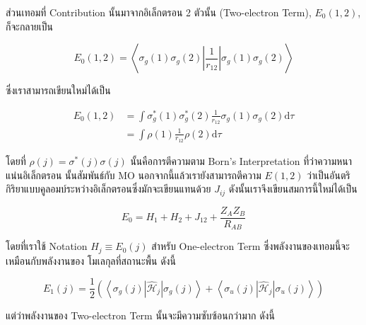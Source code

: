 ส่วนเทอมที่ Contribution นั้นมาจากอิเล็กตรอน 2 ตัวนั้น (Two-electron Term), $E_0(1,2)$, ก็จะกลายเป็น

\begin{equation}
    \label{eq:energy_one_electron_ground_state}
    E_0(1,2) 
    = 
    \left\langle
    \sigma_g(1) \sigma_g(2)\left|\frac{1}{r_{12}}\right| \sigma_g(1) \sigma_g(2)
    \right\rangle
\end{equation}

\noindent ซึ่งเราสามารถเขียนใหม่ได้เป็น

\begin{equation}
    \label{eq:energy_two_electron_ground_state}
    \begin{aligned}
        E_0(1,2) 
        & = \int \sigma_g^*(1) \sigma_g^*(2) \frac{1}{r_{12}} \sigma_g(1) \sigma_g(2) \mathrm{d} \tau \\
        & =\int \rho(1) \frac{1}{r_{12}} \rho(2) \mathrm{d} \tau
    \end{aligned}
\end{equation}

\noindent โดยที่ $\rho(j) = \sigma^*(j) \sigma(j)$ นั้นคือการตีความตาม Born's Interpretation ที่ว่าความหนาแน่นอิเล็กตรอน%
นั้นสัมพันธ์กับ MO นอกจากนี้แล้วเรายังสามารถตีความ $E(1,2)$ ว่าเป็นอันตริกิริยาแบบคูลอมบ์ระหว่างอิเล็กตรอนซึ่งมักจะเขียนแทนด้วย $J_{i j}$ 
ดังนั้นเราจึงเขียนสมการนี้ใหม่ได้เป็น

\begin{equation}
    E_0 = H_1 + H_2 + J_{12} + \frac{Z_A Z_B}{R_{A B}}
\end{equation}

\noindent โดยที่เราใช้ Notation $H_j \equiv E_0(j)$ สำหรับ One-electron Term ซึ่งพลังงานของเทอมนี้จะเหมือนกับพลังงานของ%
โมเลกุลที่สถานะพื้น ดังนี้

\begin{equation}
    \label{eq:energy_one_electron_triplet_state}
    E_1(j) 
    = 
    \frac{1}{2}
    \left(
        \left\langle\sigma_g(j)\left|\hat{\mathscr{H}}_j\right| \sigma_g(j)\right\rangle
        +
        \left\langle\sigma_u(j)\left|\hat{\mathscr{H}}_j\right| \sigma_u(j)\right\rangle
    \right)
\end{equation}

\noindent แต่ว่าพลังงานของ Two-electron Term นั้นจะมีความซับซ้อนกว่ามาก ดังนี้

